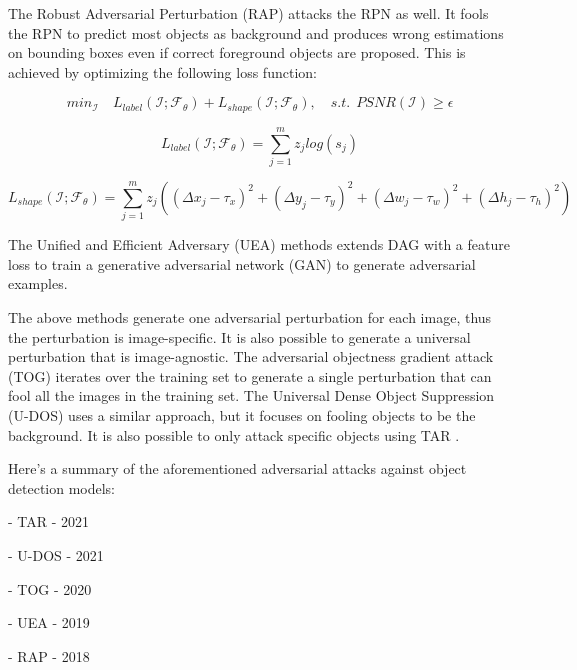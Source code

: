 The Robust Adversarial Perturbation (RAP) \citep{li2018robust} attacks the RPN as well. It fools the RPN to predict most objects as background and produces wrong estimations on bounding boxes even if correct foreground objects are proposed. This is achieved by optimizing the following loss function:

\begin{equation} 
min_\mathcal{I} \quad L_{label}(\mathcal{I};\mathcal{F}_{\theta}) + L_{shape}(\mathcal{I};\mathcal{F}_{\theta}), \quad s.t. \ \ PSNR(\mathcal{I}) \geq \epsilon
\end{equation}

\begin{equation}
    L_{label}(\mathcal{I};\mathcal{F}_{\theta}) = \sum_{j=1}^{m} z_j log(s_j)
\end{equation}

\begin{equation}
    L_{shape}(\mathcal{I};\mathcal{F}_{\theta}) = \sum_{j=1}^{m} z_j((\Delta x_j - \tau_x)^2 + (\Delta y_j - \tau_y)^2 + (\Delta w_j - \tau_w)^2 + (\Delta h_j - \tau_h)^2)
\end{equation}

The Unified and Efficient Adversary (UEA) \citep{ijcai2019-134} methods extends DAG with a feature loss to train a generative adversarial network (GAN) to generate adversarial examples. 

The above methods generate one adversarial perturbation for each image, thus the perturbation is image-specific. It is also possible to generate a universal perturbation that is image-agnostic. The adversarial objectness gradient attack (TOG)\citep{chow2020adversarial} iterates over the training set to generate a single perturbation that can fool all the images in the training set. The Universal Dense Object Suppression (U-DOS) \citep{LI2021107584} uses a similar approach, but it focuses on fooling objects to be the background. It is also possible to only attack specific objects using TAR \citep{mohamad2021}.

Here's a summary of the aforementioned adversarial attacks against object detection models:

- TAR \citep{mohamad2021} - 2021

- U-DOS \citep{LI2021107584} - 2021

- TOG \citep{chow2020adversarial} - 2020

- UEA \citep{ijcai2019-134} - 2019

- RAP \citep{li2018robust} - 2018

